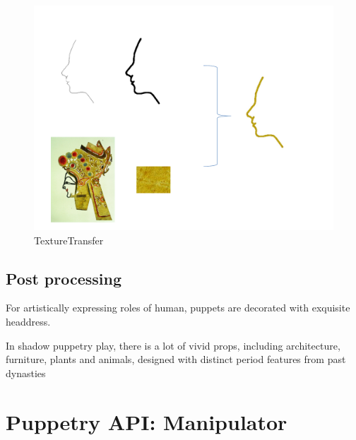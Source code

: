 \documentclass[letter]{sig-alternate}
\begin{document}
\begin{figure}[t]
\begin{center}
\includegraphics[scale=0.3]{figure/TextureTransfer.pdf}
\caption{\small{TextureTransfer}}
\label{fig:firstfig}
\end{center}
\end{figure}
    

\subsection{Post processing}
For artistically expressing roles of human, puppets are decorated with exquisite headdress. 

In shadow puppetry play, there is a lot of vivid props, including architecture, furniture, plants and animals, designed with distinct period features from past dynasties

\section{Puppetry API:  Manipulator}





\end{document}
